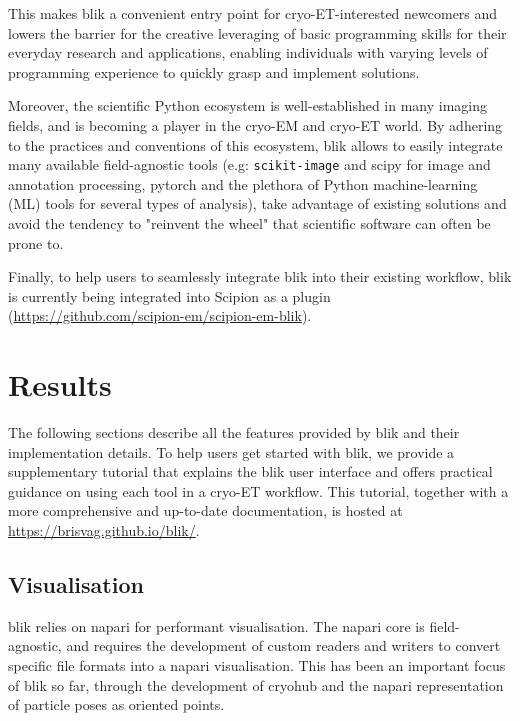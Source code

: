 This makes blik a convenient entry point for cryo-ET-interested newcomers and lowers the barrier for the creative leveraging of basic programming skills for their everyday research and applications, enabling individuals with varying levels of programming experience to quickly grasp and implement solutions.

Moreover, the scientific Python ecosystem is well-established in many imaging fields, and is becoming a player in the cryo-EM and cryo-ET world. By adhering to the practices and conventions of this ecosystem, blik allows to easily integrate many available field-agnostic tools (e.g: \texttt{scikit-image} and scipy for image and annotation processing, pytorch and the plethora of Python machine-learning (ML) tools for several types of analysis), take advantage of existing solutions and avoid the tendency to "reinvent the wheel" that scientific software can often be prone to.

\vspace{\baselineskip}

Finally, to help users to seamlessly integrate blik into their existing workflow, blik is currently being integrated into Scipion as a plugin (\url{https://github.com/scipion-em/scipion-em-blik}).

\section{Results}

The following sections describe all the features provided by blik and their implementation details. To help users get started with blik, we provide a supplementary tutorial that explains the blik user interface and offers practical guidance on using each tool in a cryo-ET workflow. This tutorial, together with a more comprehensive and up-to-date documentation, is hosted at \url{https://brisvag.github.io/blik/}.

\subsection{Visualisation}\label{visualisation}

blik relies on napari for performant visualisation. The napari core is field-agnostic, and requires the development of custom readers and writers to convert specific file formats into a napari visualisation. This has been an important focus of blik so far, through the development of cryohub and the napari representation of particle poses as oriented points.

